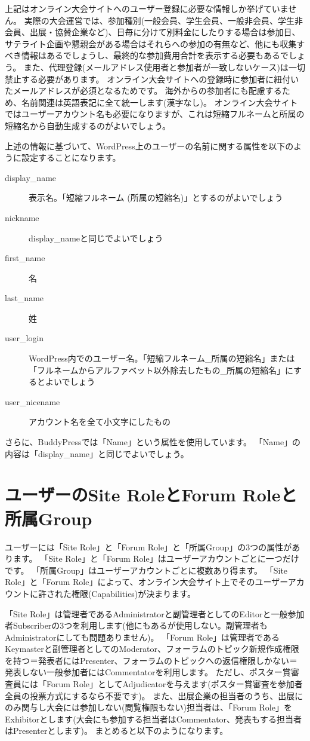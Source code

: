 \documentclass[titlepage,10pt,a4paper,uplatex]{jsbook}
\begin{document}
上記はオンライン大会サイトへのユーザー登録に必要な情報しか挙げていません。
実際の大会運営では、参加種別(一般会員、学生会員、一般非会員、学生非会員、出展・協賛企業など)、日毎に分けて別料金にしたりする場合は参加日、サテライト企画や懇親会がある場合はそれらへの参加の有無など、他にも収集すべき情報はあるでしょうし、最終的な参加費用合計を表示する必要もあるでしょう。
また、代理登録(メールアドレス使用者と参加者が一致しないケース)は一切禁止する必要があります。
オンライン大会サイトへの登録時に参加者に紐付いたメールアドレスが必須となるためです。
海外からの参加者にも配慮するため、名前関連は英語表記に全て統一します(漢字なし)。
オンライン大会サイトではユーザーアカウント名も必要になりますが、これは短縮フルネームと所属の短縮名から自動生成するのがよいでしょう。

上述の情報に基づいて、WordPress上のユーザーの名前に関する属性を以下のように設定することになります。

\begin{description}
\item[display\_name] 表示名。「短縮フルネーム (所属の短縮名)」とするのがよいでしょう
\item[nickname] display\_nameと同じでよいでしょう
\item[first\_name] 名
\item[last\_name] 姓
\item[user\_login] WordPress内でのユーザー名。「短縮フルネーム\_所属の短縮名」または「フルネームからアルファベット以外除去したもの\_所属の短縮名」にするとよいでしょう
\item[user\_nicename] アカウント名を全て小文字にしたもの
\end{description}

さらに、BuddyPressでは「Name」という属性を使用しています。
「Name」の内容は「display\_name」と同じでよいでしょう。

\section{ユーザーのSite RoleとForum Roleと所属Group}

ユーザーには「Site Role」と「Forum Role」と「所属Group」の3つの属性があります。
「Site Role」と「Forum Role」はユーザーアカウントごとに一つだけです。
「所属Group」はユーザーアカウントごとに複数あり得ます。
「Site Role」と「Forum Role」によって、オンライン大会サイト上でそのユーザーアカウントに許された権限(Capabilities)が決まります。

「Site Role」は管理者であるAdministratorと副管理者としてのEditorと一般参加者Subscriberの3つを利用します(他にもあるが使用しない。副管理者もAdministratorにしても問題ありません)。
「Forum Role」は管理者であるKeymasterと副管理者としてのModerator、フォーラムのトピック新規作成権限を持つ＝発表者にはPresenter、フォーラムのトピックへの返信権限しかない＝発表しない一般参加者にはCommentatorを利用します。
ただし、ポスター賞審査員には「Forum Role」としてAdjudicatorを与えます(ポスター賞審査を参加者全員の投票方式にするなら不要です)。
また、出展企業の担当者のうち、出展にのみ関与し大会には参加しない(閲覧権限もない)担当者は、「Forum Role」をExhibitorとします(大会にも参加する担当者はCommentator、発表もする担当者はPresenterとします)。
まとめると以下のようになります。
\end{document}
